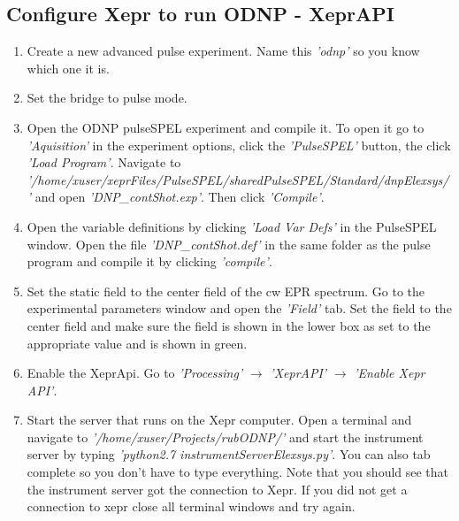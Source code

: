 \documentclass{article}
\newcommand{\fc}[1]{{\color{blue}\textit{'{#1}'}}}
\begin{document}
\subsection{Configure Xepr to run ODNP - XeprAPI}
\begin{enumerate}
    \item Create a new advanced pulse experiment. Name this \fc{odnp} so you know which one it is.
    \item Set the bridge to pulse mode.
    \item Open the ODNP pulseSPEL experiment and compile it. To open it go to \fc{Aquisition} in the experiment options, click the \fc{PulseSPEL} button, the click \fc{Load Program}. Navigate to \\ \fc{/home/xuser/xeprFiles/PulseSPEL/sharedPulseSPEL/Standard/dnpElexsys/} and open \fc{DNP\_contShot.exp}. Then click \fc{Compile}.
    \item Open the variable definitions by clicking \fc{Load Var Defs} in the PulseSPEL window. Open the file \fc{DNP\_contShot.def} in the same folder as the pulse program and compile it by clicking \fc{compile}.
    \item Set the static field to the center field of the cw EPR spectrum. Go to the experimental parameters window and open the \fc{Field} tab. Set the field to the center field and make sure the field is shown in the lower box as set to the appropriate value and is shown in green.
    \item Enable the XeprApi. Go to \fc{Processing} $\rightarrow$ \fc{XeprAPI} $\rightarrow$ \fc{Enable Xepr API}.
    \item Start the server that runs on the Xepr computer. Open a terminal and navigate to \fc{/home/xuser/Projects/rubODNP/} and start the instrument server by typing \fc{python2.7 instrumentServerElexsys.py}. You can also tab complete so you don't have to type everything. Note that you should see that the instrument server got the connection to Xepr. If you did not get a connection to xepr close all terminal windows and try again.
\end{enumerate}
\end{document}
